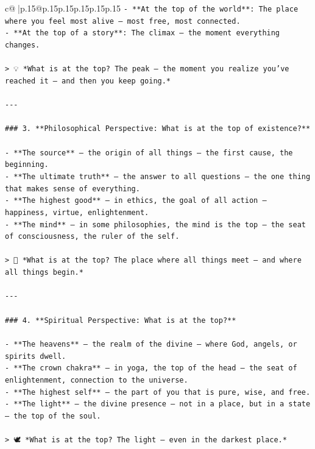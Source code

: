 \documentclass{article}
\begin{document}
{\begin{supertabular}{c@{$\;$}|p{.15\linewidth}@{}p{.15\linewidth}p{.15\linewidth}p{.15\linewidth}p{.15\linewidth}p{.15\linewidth}}
{{{\texttt{{-} **At the top of the world**: The place where you feel most alive — most free, most connected.} \\
\texttt{{-} **At the top of a story**: The climax — the moment everything changes.} \\
\\ 
\texttt{> 💡 *What is at the top? The peak — the moment you realize you’ve reached it — and then you keep going.*} \\
\\ 
\texttt{{-}{-}{-}} \\
\\ 
\texttt{\#\#\# 3. **Philosophical Perspective: What is at the top of existence?**} \\
\\ 
\texttt{{-} **The source** — the origin of all things — the first cause, the beginning.} \\
\texttt{{-} **The ultimate truth** — the answer to all questions — the one thing that makes sense of everything.} \\
\texttt{{-} **The highest good** — in ethics, the goal of all action — happiness, virtue, enlightenment.} \\
\texttt{{-} **The mind** — in some philosophies, the mind is the top — the seat of consciousness, the ruler of the self.} \\
\\ 
\texttt{> 🧠 *What is at the top? The place where all things meet — and where all things begin.*} \\
\\ 
\texttt{{-}{-}{-}} \\
\\ 
\texttt{\#\#\# 4. **Spiritual Perspective: What is at the top?**} \\
\\ 
\texttt{{-} **The heavens** — the realm of the divine — where God, angels, or spirits dwell.} \\
\texttt{{-} **The crown chakra** — in yoga, the top of the head — the seat of enlightenment, connection to the universe.} \\
\texttt{{-} **The highest self** — the part of you that is pure, wise, and free.} \\
\texttt{{-} **The light** — the divine presence — not in a place, but in a state — the top of the soul.} \\
\\ 
\texttt{> 🕊️ *What is at the top? The light — even in the darkest place.*} \\
}}}
\end{supertabular}}
\end{document}
